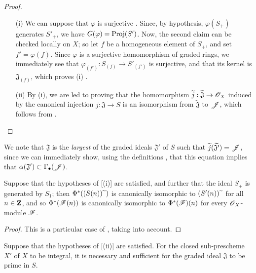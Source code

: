 \begin{proof}
\begin{enumerate}
  \item[\rm{(i)}] We can suppose that $\varphi$ is surjective .
    Since, by hypothesis, $\varphi(S_+)$ generates $S'_+$, we have $G(\varphi)=\operatorname{Proj}(S')$.
    Now, the second claim can be checked locally on $X$;
    so let $f$ be a homogeneous element of $S_+$, and set $f'=\varphi(f)$.
    Since $\varphi$ is a surjective homomorphism of graded rings, we immediately see that $\varphi_{(f')}:S_{(f)}\to S'_{(f')}$ is surjective, and that its kernel is $\mathfrak{J}_{(f)}$, which proves (i) .
  \item[\rm{(ii)}] By (i), we are led to proving that the homomorphism $\widetilde{j}:\widetilde{\mathfrak{J}}\to\sh{O}_X$ induced by the canonical injection $j:\mathfrak{J}\to S$ is an isomorphism from $\widetilde{\mathfrak{J}}$ to $\mathscr{J}$, which follows from .
\end{enumerate}
\end{proof}

We note that $\mathfrak{J}$ is the \emph{largest} of the graded ideals $\mathfrak{J}'$ of $S$ such that $\widetilde{j}(\widetilde{\mathfrak{J'}})=\mathscr{J}$, since we can immediately show, using the definitions , that this equation implies that $\alpha(\mathfrak{J}')\subset\Gamma_\bullet(\mathscr{J})$.

\begin{corollary}[2.9.3]
\label{II.2.9.3}
Suppose that the hypotheses of [(i)] are satisfied, and further that the ideal $S_+$ is generated by $S_1$;
then $\Phi^*((S(n)){\,\widetilde{\,}\,})$ is canonically isomorphic to $(S'(n)){\,\widetilde{\,}\,}$ for all $n\in\mathbf{Z}$, and so $\Phi^*(\mathscr{F}(n))$ is canonically isomorphic to $\Phi^*(\mathscr{F})(n)$ for every $\mathscr{O}_X$-module $\mathscr{F}$.
\end{corollary}

\begin{proof}
This is a particular case of , taking  into account.
\end{proof}

\begin{corollary}[2.9.4]
\label{II.2.9.4}
Suppose that the hypotheses of [(ii)] are satisfied.
For the closed sub-prescheme $X'$ of $X$ to be integral, it is necessary and sufficient for the graded ideal $\mathfrak{J}$ to be prime in $S$.
\end{corollary}

